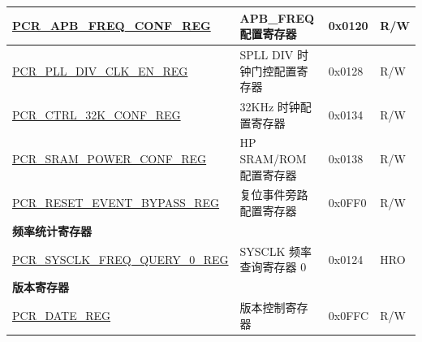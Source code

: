 \begin{longtable}{ | p{6cm} | p{7.2cm} | p{1.3cm} | p{1cm} | }
\hyperref[regdesc:PCRAPBFREQCONFREG]{PCR\_APB\_FREQ\_CONF\_REG} & APB\_FREQ 配置寄存器 & 0x0120 & R/W \\ \hline
\hyperref[regdesc:PCRPLLDIVCLKENREG]{PCR\_PLL\_DIV\_CLK\_EN\_REG} & SPLL DIV 时钟门控配置寄存器 & 0x0128 & R/W \\ \hline
\hyperref[regdesc:PCRCTRL32KCONFREG]{PCR\_CTRL\_32K\_CONF\_REG} & 32KHz 时钟配置寄存器 & 0x0134 & R/W \\ \hline
\hyperref[regdesc:PCRSRAMPOWERCONFREG]{PCR\_SRAM\_POWER\_CONF\_REG} & HP SRAM/ROM 配置寄存器 & 0x0138 & R/W \\ \hline
\hyperref[regdesc:PCRRESETEVENTBYPASSREG]{PCR\_RESET\_EVENT\_BYPASS\_REG} & 复位事件旁路配置寄存器 & 0x0FF0 & R/W \\ \hline
\multicolumn{4}{|l|}{\textbf{频率统计寄存器}} \\ \hline
\hyperref[regdesc:PCRSYSCLKFREQQUERY0REG]{PCR\_SYSCLK\_FREQ\_QUERY\_0\_REG} & SYSCLK 频率查询寄存器 0 & 0x0124 & HRO \\ \hline
\multicolumn{4}{|l|}{\textbf{版本寄存器}} \\ \hline
\hyperref[regdesc:PCRDATEREG]{PCR\_DATE\_REG} & 版本控制寄存器 & 0x0FFC & R/W \\ \hline
\end{longtable}
